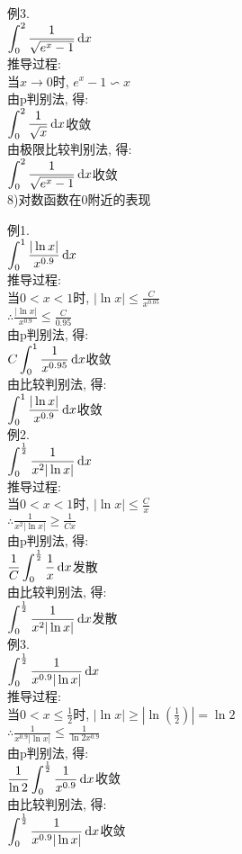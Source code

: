 例3.\\
\phantom{例}$\displaystyle\int_0^2\frac{1}{\sqrt{e^x-1}}\mathop{}\!\mathrm{d} x$\\
推导过程:\\
当$x\to 0$时, $e^x-1\backsim x$\\
由p判别法, 得:\\
$\displaystyle\int_0^2\frac{1}{\sqrt{x}}\mathop{}\!\mathrm{d} x$收敛\\
由极限比较判别法, 得:\\
$\displaystyle\int_0^2\frac{1}{\sqrt{e^x-1}}\mathop{}\!\mathrm{d} x$收敛\\[2ex]

8)对数函数在0附近的表现
\begin{center}
\end{center}

例1.\\
\phantom{例}$\displaystyle\int_0^1\frac{|\ln x|}{x^{0.9}}\mathop{}\!\mathrm{d} x$\\
推导过程:\\
当$0<x<1$时, $|\ln x|\leqslant\frac{C}{x^{0.05}}$\\
$\displaystyle\therefore\frac{|\ln x|}{x^{0.9}}\leqslant\frac{C}{0.95}$\\
由p判别法, 得:\\
$\displaystyle C\int_0^1\frac{1}{x^{0.95}}\mathop{}\!\mathrm{d} x$收敛\\
由比较判别法, 得:\\
$\displaystyle\int_0^1\frac{|\ln x|}{x^{0.9}}\mathop{}\!\mathrm{d} x$收敛\\[1ex]

例2.\\
\phantom{例}$\displaystyle\int_0^{\frac{1}{2}}\frac{1}{x^2|\ln x|}\mathop{}\!\mathrm{d} x$\\
推导过程:\\
当$0<x<1$时, $|\ln x|\leqslant\frac{C}{x}$\\
$\displaystyle\therefore\frac{1}{x^2|\ln x|}\geqslant\frac{1}{Cx}$\\
由p判别法, 得:\\
$\displaystyle\frac{1}{C}\int_0^{\frac{1}{2}}\frac{1}{x}\mathop{}\!\mathrm{d} x$发散\\
由比较判别法, 得:\\
$\displaystyle\int_0^{\frac{1}{2}}\frac{1}{x^2|\ln x|}\mathop{}\!\mathrm{d} x$发散\\[1ex]

例3.\\
\phantom{例}$\displaystyle\int_0^{\frac{1}{2}}\frac{1}{x^{0.9}|\ln x|}\mathop{}\!\mathrm{d} x$\\
推导过程:\\
当$0<x\leqslant\frac{1}{2}$时, $|\ln x|\geqslant|\ln(\frac{1}{2})|=\ln 2$\\
$\displaystyle\therefore\frac{1}{x^{0.9}|\ln x|}\leqslant\frac{1}{\ln2 x^{0.9}}$\\
由p判别法, 得:\\
$\displaystyle\frac{1}{\ln 2}\int_0^{\frac{1}{2}}\frac{1}{x^{0.9}}\mathop{}\!\mathrm{d} x$收敛\\
由比较判别法, 得:\\
$\displaystyle\int_0^{\frac{1}{2}}\frac{1}{x^{0.9}|\ln x|}\mathop{}\!\mathrm{d} x$收敛\\[2ex]

